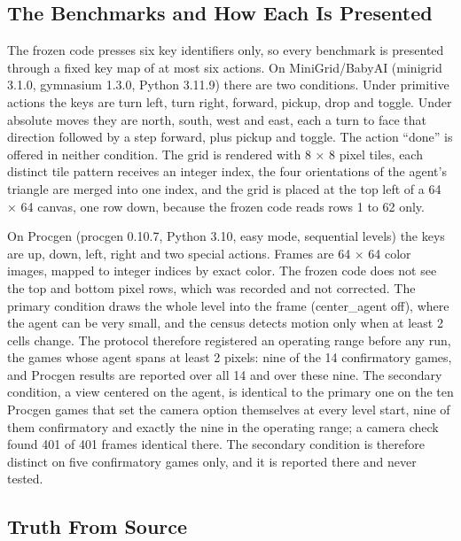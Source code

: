 \documentclass[journal]{IEEEtran}
\begin{document}
\subsection{The Benchmarks and How Each Is
Presented}\label{the-benchmarks-and-how-each-is-presented}

The frozen code presses six key identifiers only, so every benchmark is
presented through a fixed key map of at most six actions. On
MiniGrid/BabyAI (minigrid 3.1.0, gymnasium 1.3.0, Python 3.11.9) there
are two conditions. Under primitive actions the keys are turn left, turn
right, forward, pickup, drop and toggle. Under absolute moves they are
north, south, west and east, each a turn to face that direction followed
by a step forward, plus pickup and toggle. The action ``done'' is
offered in neither condition. The grid is rendered with 8 × 8 pixel
tiles, each distinct tile pattern receives an integer index, the four
orientations of the agent's triangle are merged into one index, and the
grid is placed at the top left of a 64 × 64 canvas, one row down,
because the frozen code reads rows 1 to 62 only.

On Procgen (procgen 0.10.7, Python 3.10, easy mode, sequential levels)
the keys are up, down, left, right and two special actions. Frames are
64 × 64 color images, mapped to integer indices by exact color. The
frozen code does not see the top and bottom pixel rows, which was
recorded and not corrected. The primary condition draws the whole level
into the frame (center\_agent off), where the agent can be very small,
and the census detects motion only when at least 2 cells change. The
protocol therefore registered an operating range before any run, the
games whose agent spans at least 2 pixels: nine of the 14 confirmatory
games, and Procgen results are reported over all 14 and over these nine.
The secondary condition, a view centered on the agent, is identical to
the primary one on the ten Procgen games that set the camera option
themselves at every level start, nine of them confirmatory and exactly
the nine in the operating range; a camera check found 401 of 401 frames
identical there. The secondary condition is therefore distinct on five
confirmatory games only, and it is reported there and never tested.

\subsection{Truth From Source}\label{truth-from-source}
\end{document}

